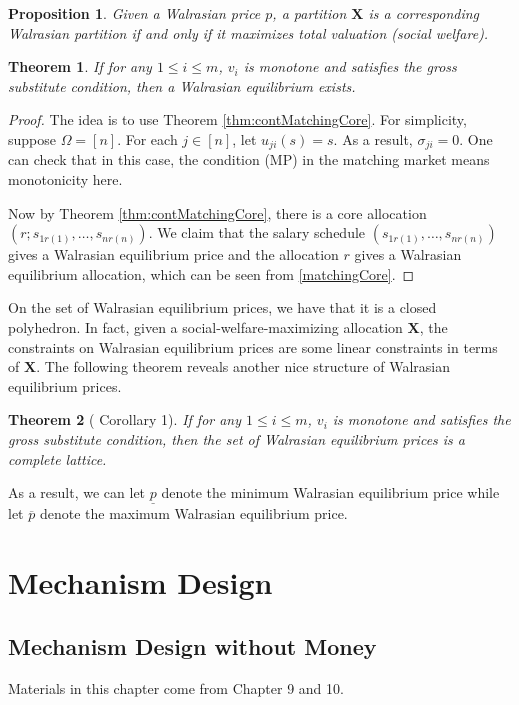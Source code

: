 \documentclass[openany]{book}
\newtheorem{theorem}{Theorem}[chapter]
\newtheorem{proposition}{Proposition}[chapter]
\theoremstyle{remark}
\begin{document}
\begin{proposition}
    Given a Walrasian price $p$, a partition $\mathbf{X}$ is a corresponding Walrasian partition if and only if it maximizes total valuation (social welfare).
\end{proposition}

\begin{theorem}
    If for any $1\le i\le m$, $v_i$ is monotone and satisfies the gross substitute condition, then a Walrasian equilibrium exists.
\end{theorem}
\begin{proof}
    The idea is to use Theorem \ref{thm:contMatchingCore}. For simplicity, suppose $\Omega=[n]$. For each $j\in[n]$, let $u_{ji}(s)=s$. As a result, $\sigma_{ji}=0$. One can check that in this case, the condition (MP) in the matching market means monotonicity here.

    Now by Theorem \ref{thm:contMatchingCore}, there is a core allocation $(r;s_{1r(1)},\ldots,s_{nr(n)})$. We claim that the salary schedule $(s_{1r(1)},\ldots,s_{nr(n)})$ gives a Walrasian equilibrium price and the allocation $r$ gives a Walrasian equilibrium allocation, which can be seen from \eqref{matchingCore}.
\end{proof}

On the set of Walrasian equilibrium prices, we have that it is a closed polyhedron. In fact, given a social-welfare-maximizing allocation $\mathbf{X}$, the constraints on Walrasian equilibrium prices are some linear constraints in terms of $\mathbf{X}$. The following theorem reveals another nice structure of Walrasian equilibrium prices.
\begin{theorem}[\cite{GS99} Corollary 1]
    If for any $1\le i\le m$, $v_i$ is monotone and satisfies the gross substitute condition, then the set of Walrasian equilibrium prices is a complete lattice.
\end{theorem}
As a result, we can let $\underline{p}$ denote the minimum Walrasian equilibrium price while let $\overline{p}$ denote the maximum Walrasian equilibrium price.

\part{Mechanism Design}
\chapter{Mechanism Design without Money}
Materials in this chapter come from \cite{NRTV07} Chapter 9 and 10.
\end{document}
